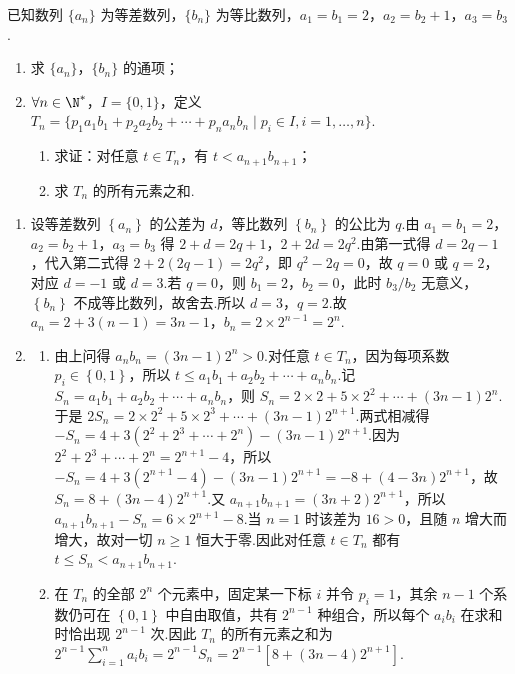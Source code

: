\begin{problem}
已知数列 \(\{a_n\}\) 为等差数列，\(\{b_n\}\) 为等比数列，\(a_1=b_1=2\)，\(a_2=b_2+1\)，\(a_3=b_3\).
\begin{enumerate}
\item 求 \(\{a_n\}\)，\(\{b_n\}\) 的通项；
\item \(\forall n\in\N^*\)，\(I=\{0,1\}\)，定义 \(T_n=\{p_1a_1b_1+p_2a_2b_2+\cdots+p_na_nb_n\mid p_i\in I,i=1,\dots,n\}\).
\begin{enumerate}
\item 求证：对任意 \(t\in T_n\)，有 \(t<a_{n+1}b_{n+1}\)；
\item 求 \(T_n\) 的所有元素之和.
\end{enumerate}
\end{enumerate}
\end{problem}

\begin{solution}
\begin{enumerate}
\item 设等差数列 \(\left\{a_n\right\}\) 的公差为 \(d\)，等比数列 \(\left\{b_n\right\}\) 的公比为 \(q\).由 \(a_1=b_1=2\)，\(a_2=b_2+1\)，\(a_3=b_3\) 得 \(2+d=2q+1\)，\(2+2d=2q^2\).由第一式得 \(d=2q-1\)，代入第二式得 \(2+2\left(2q-1\right)=2q^2\)，即 \(q^2-2q=0\)，故 \(q=0\) 或 \(q=2\)，对应 \(d=-1\) 或 \(d=3\).若 \(q=0\)，则 \(b_1=2\)，\(b_2=0\)，此时 \(b_3/b_2\) 无意义，\(\left\{b_n\right\}\) 不成等比数列，故舍去.所以 \(d=3\)，\(q=2\).故 \(a_n=2+3\left(n-1\right)=3n-1\)，\(b_n=2\times 2^{n-1}=2^n\).
\item
\begin{enumerate}
\item 由上问得 \(a_nb_n=\left(3n-1\right)2^n>0\).对任意 \(t\in T_n\)，因为每项系数 \(p_i\in\left\{0,1\right\}\)，所以 \(t\le a_1b_1+a_2b_2+\cdots+a_nb_n\).记 \(S_n=a_1b_1+a_2b_2+\cdots+a_nb_n\)，则 \(S_n=2\times 2+5\times 2^2+\cdots+\left(3n-1\right)2^n\).于是 \(2S_n=2\times 2^2+5\times 2^3+\cdots+\left(3n-1\right)2^{n+1}\).两式相减得 \(-S_n=4+3\left(2^2+2^3+\cdots+2^n\right)-\left(3n-1\right)2^{n+1}\).因为 \(2^2+2^3+\cdots+2^n=2^{n+1}-4\)，所以 \(-S_n=4+3\left(2^{n+1}-4\right)-\left(3n-1\right)2^{n+1}=-8+\left(4-3n\right)2^{n+1}\)，故 \(S_n=8+\left(3n-4\right)2^{n+1}\).又 \(a_{n+1}b_{n+1}=\left(3n+2\right)2^{n+1}\)，所以 \(a_{n+1}b_{n+1}-S_n=6\times 2^{n+1}-8\).当 \(n=1\) 时该差为 \(16>0\)，且随 \(n\) 增大而增大，故对一切 \(n\ge 1\) 恒大于零.因此对任意 \(t\in T_n\) 都有 \(t\le S_n<a_{n+1}b_{n+1}\).
\item 在 \(T_n\) 的全部 \(2^n\) 个元素中，固定某一下标 \(i\) 并令 \(p_i=1\)，其余 \(n-1\) 个系数仍可在 \(\left\{0,1\right\}\) 中自由取值，共有 \(2^{n-1}\) 种组合，所以每个 \(a_ib_i\) 在求和时恰出现 \(2^{n-1}\) 次.因此 \(T_n\) 的所有元素之和为 \(2^{n-1}\sum_{i=1}^n a_ib_i=2^{n-1}S_n=2^{n-1}\left[8+\left(3n-4\right)2^{n+1}\right]\).
\end{enumerate}
\end{enumerate}
\end{solution}

